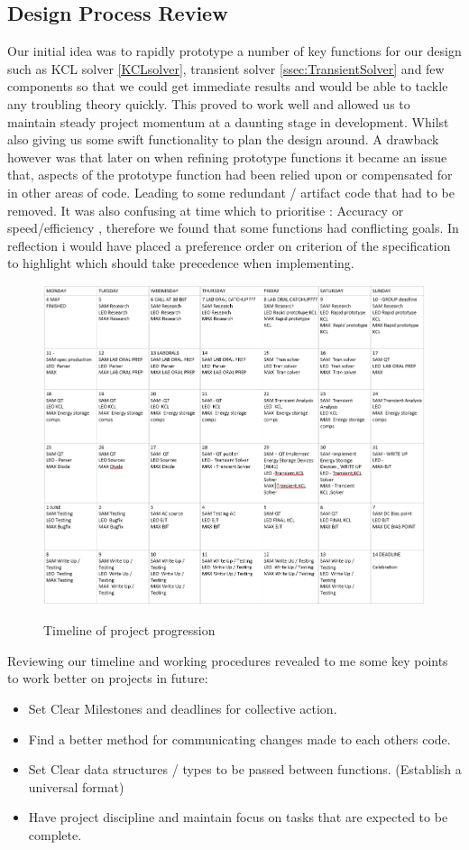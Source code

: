 \documentclass{article}
\begin{document}
\newpage
\subsection{Design Process Review}

Our initial idea was to rapidly prototype a number of key functions for our design such as KCL solver \ref{KCLsolver}, transient solver \ref{ssec:TransientSolver} and few components so that we could get immediate results and would be able to tackle any troubling theory quickly. This proved to work well and allowed us to maintain steady project momentum at a daunting stage in development. Whilst also giving us some swift functionality to  plan the design around.  A drawback however was that later on when refining prototype functions it became an issue that, aspects of the prototype function had been relied upon or compensated for in other areas of code. Leading to some redundant / artifact code that had to be removed.
\medbreak
It was also confusing at time which to prioritise : Accuracy or speed/efficiency , therefore we found that some functions had conflicting goals. In reflection i would have placed a preference order on criterion of the specification to highlight which should take precedence when implementing.  
\smallbreak
\begin{figure}[h]
    \caption{Timeline of project progression}
    \centering
    \includegraphics[width=0.6\linewidth]{images/Timeline.PNG}
    \label{fig:Timeline}
\end{figure}
Reviewing our timeline and working procedures revealed to me some key points to work better on projects in future:
\begin{itemize}
    \item Set Clear Milestones and deadlines for collective action.
    \item Find a better method for communicating changes made to each others code.
    \item Set Clear data structures / types to be passed between functions. (Establish a universal format)
    \item Have project discipline and maintain focus on tasks that are expected to be complete.
\end{itemize}
\newpage
\end{document}
